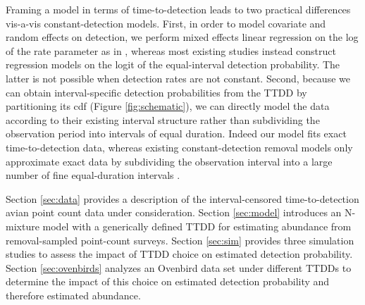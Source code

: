 \documentclass[12pt]{article}
\newcommand{\adam}[1]{{\color{blue} ADAM: #1}}
\begin{document}
Framing a model in terms of time-to-detection leads to two practical differences vis-a-vis constant-detection models.  
First, in order to model covariate and random effects on detection, we perform mixed effects linear regression on the log of the rate parameter as in \citet{Solymos2013}, whereas most existing studies instead construct regression models on the logit of the equal-interval detection probability.  
The latter is not possible when detection rates are not constant.  
Second, because we can obtain interval-specific detection probabilities from the TTDD by partitioning its cdf (Figure \ref{fig:schematic}), we can directly model the data according to their existing interval structure rather than subdividing the observation period into intervals of equal duration.  
Indeed our model fits exact time-to-detection data, whereas existing constant-detection removal models only approximate exact data by subdividing the observation interval into a large number of fine equal-duration intervals \citep{Reidy2011, Amundson2014}.



Section \ref{sec:data} provides a description of the interval-censored time-to-detection avian point count data under consideration.
Section \ref{sec:model} introduces an N-mixture model with a generically defined TTDD for estimating abundance from removal-sampled point-count surveys.
Section \ref{sec:sim} provides three simulation studies to assess the impact of TTDD choice on estimated detection probability. 
Section \ref{sec:ovenbirds} analyzes an Ovenbird data set under different TTDDs to determine the impact of this choice on estimated detection probability and therefore estimated abundance.
\end{document}
